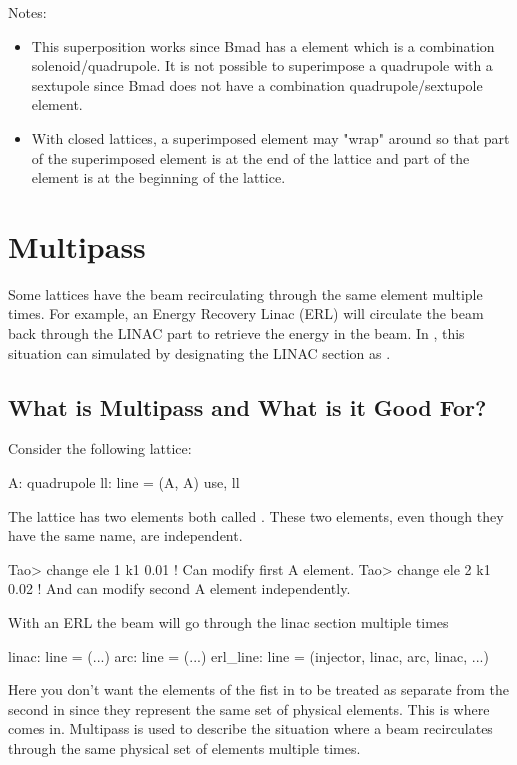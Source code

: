 \documentclass{hitec}
\newcommand{\Section}[1]{\section{#1}\vspace*{-1ex}}
\begin{document}
Notes:
\begin{itemize}
\item This superposition works since Bmad has a  element which is a combination solenoid/quadrupole. It is not possible
to superimpose a quadrupole with a sextupole since Bmad does not have a combination quadrupole/sextupole element.
\item With closed lattices, a superimposed element may "wrap" around so that part of the superimposed element is at the end of the lattice
and part of the element is at the beginning of the lattice.
\end{itemize}

\Section{Multipass}

Some lattices have the beam recirculating through the same element multiple times. For example, an
Energy Recovery Linac (ERL) will circulate the beam back through the LINAC part to retrieve the
energy in the beam. In \bmad, this situation can simulated by designating the LINAC section as . 

\subsection{What is Multipass and What is it Good For?}

Consider the following lattice:
{\small
\begin{code}
A: quadrupole
ll: line = (A, A)
use, ll
\end{code}}
The lattice has two elements both called . These two elements, even though they have the same name, are independent.
{\small
\begin{code}
Tao> change ele 1 k1 0.01   ! Can modify first A element.
Tao> change ele 2 k1 0.02   ! And can modify second A element independently.
\end{code}}
With an ERL the beam will go through the linac section multiple times
{\small
\begin{code}
linac: line = (...)
arc: line = (...)
erl_line: line = (injector, linac, arc, linac, ...)
\end{code}}
Here you don't want the elements of the fist  in  to be treated as separate
from the second  in  since they represent the same set of physical elements.
This is where  comes in.  Multipass is used to describe the situation where a beam
recirculates through the same physical set of elements multiple times.
\end{document}
